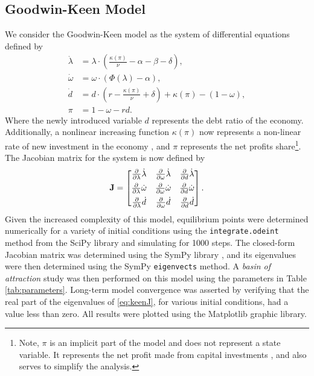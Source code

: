 \documentclass[12pt, centerh1]{article}
\begin{document}
\subsection{Goodwin-Keen Model}
We consider the Goodwin-Keen model as the system of differential equations defined by 
\begin{equation} \label{eq:keen}
\begin{split}
    \dot{\lambda} &= \lambda \cdot \left( \frac{\kappa(\pi)}{\nu} - \alpha - \beta - \delta \right),\\
    \dot{\omega} &= \omega \cdot (\Phi(\lambda) - \alpha),\\
    \dot{d} &= d\cdot\left(r-\frac{\kappa(\pi)}{\nu}+\delta\right)+\kappa(\pi)-(1-\omega), \\
    \pi &= 1-\omega-rd.
\end{split}
\end{equation}
Where the newly introduced variable $d$ represents the debt ratio of the economy. Additionally, a nonlinear increasing function $\kappa(\pi)$ now represents a non-linear rate of new investment in the economy \citep{grasselli2012analysis}, and $\pi$ represents the net profits share\footnote{Note, $\pi$ is an implicit part of the model and does not represent a state variable. It represents the net profit made from capital investments \citep{grasselli2012analysis}, and also serves to simplify the analysis.}. The Jacobian matrix for the system is now defined by 
\begin{equation} \label{eq:keenJ}
\mathbf J =
\begin{bmatrix}
    \pdv{\lambda}\dot{\lambda} & \pdv{\omega}\dot{\lambda} & \pdv{d}\dot{\lambda}\\[1ex]
    \pdv{\lambda}\dot{\omega} & \pdv{\omega}\dot{\omega} & \pdv{d}\dot{\omega}\\[1ex]
    \pdv{\lambda}\dot{d} & \pdv{\omega}\dot{d} & \pdv{d}\dot{d}
\end{bmatrix}.
\end{equation}
Given the increased complexity of this model, equilibrium points were determined numerically for a variety of initial conditions using the \texttt{integrate.odeint} method from the SciPy library \citep{2020SciPy-NMeth} and simulating for 1000 steps. The closed-form Jacobian matrix was determined using the SymPy library \citep{SymPy}, and its eigenvalues were then determined using the SymPy \texttt{eigenvects} method. A \emph{basin of attraction} study was then performed on this model using the parameters in Table \ref{tab:parameters}. Long-term model convergence was asserted by verifying that the real part of the eigenvalues of \eqref{eq:keenJ}, for various initial conditions, had a value less than zero. All results were plotted using the Matplotlib \citep{matplotlib} graphic library.
\end{document}
